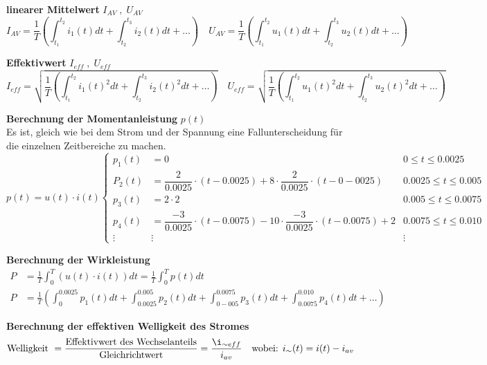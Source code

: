 \textbf{linearer Mittelwert} $I_{AV}\;,\;U_{AV}$
\[
I_{AV}= \frac{1}{T}\left(\int_{t_1}^{t_2} i_1(t) dt + \int_{t_2}^{t_3} i_2(t) dt +\ldots\right) \quad U_{AV} =\frac{1}{T} \left(\int_{t_1}^{t_2} u_1(t) dt + \int_{t_2}^{t_3} u_2(t) dt +\ldots\right)
\]

\textbf{Effektivwert} $I_{eff}\;,\;U_{eff}$
\[
I_{eff}= \sqrt{\frac{1}{T}\left(\int_{t_1}^{t_2} i_1(t)^2 dt + \int_{t_2}^{t_3} i_2(t)^2 dt +\ldots\right)} \quad U_{eff} =\sqrt{\frac{1}{T} \left(\int_{t_1}^{t_2} u_1(t)^2 dt + \int_{t_2}^{t_3} u_2(t)^2 dt +\ldots\right)}
\]

\textbf{Berechnung der Momentanleistung} $p(t)$\\
Es ist, gleich wie bei dem Strom und der Spannung eine Fallunterscheidung für die einzelnen Zeitbereiche zu machen.
\[
 p(t) = u(t)\cdot i(t) \left\lbrace 
 \begin{array}{rrr}
 p_1(t)&=0&0\leq t\leq 0.0025\\
 P_2(t)&=\dfrac{2}{0.0025}\cdot(t-0.0025)+8\cdot\dfrac{2}{0.0025}\cdot(t-0-0025)&0.0025\leq t\leq 0.005\\
 p_3(t) &= 2\cdot 2&0.005\leq t \leq 0.0075\\
 p_4(t)&=\dfrac{-3}{0.0025}\cdot (t-0.0075)-10 \cdot \dfrac{-3}{0.0025}\cdot (t-0.0075)+2&0.0075\leq t\leq 0.010\\
 \vdots&\vdots&\vdots
 \end{array}
 \right.
\]

\textbf{Berechnung der Wirkleistung}
\begin{align*}
P&=\frac{1}{T}\int_0^T(u(t)\cdot i(t)) dt = \frac{1}{T}\int_0^T p(t)dt\\
P&=\frac{1}{T}\left(\int_{0}^{0.0025}p_1(t)dt + \int_{0.0025}^{0.005}p_2(t)dt + \int_{0-005}^{0.0075}p_3(t)dt + \int_{0.0075}^{0.010}p_4(t)dt +\ldots\right)
\end{align*}

\textbf{Berechnung der effektiven Welligkeit des Stromes}
\[
	\textrm{Welligkeit } = \dfrac{\textrm{Effektivwert des Wechselanteils}}{\textrm{Gleichrichtwert}}	= \frac{\i_{\sim eff}}{i_{av}} \quad \textrm{wobei: } i_{\sim}(t) = i(t) - i_{av}
\]

